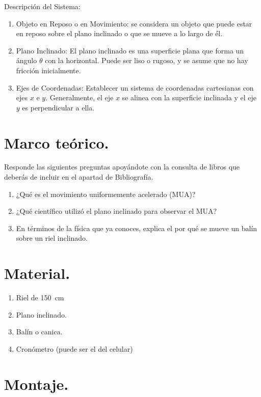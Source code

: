 \documentclass[14pt]{extarticle}
\begin{document}
Descripción del Sistema:

\begin{enumerate}
\item Objeto en Reposo o en Movimiento: se considera un objeto que puede estar en reposo sobre el plano inclinado o que se mueve a lo largo de él.
\item Plano Inclinado: El plano inclinado es una superficie plana que forma un ángulo $\theta$ con la horizontal. Puede ser liso o rugoso, y se asume que no hay fricción inicialmente.
\item Ejes de Coordenadas: Establecer un sistema de coordenadas cartesianas con ejes $x$ e $y$. Generalmente, el eje $x$ se alinea con la superficie inclinada y el eje $y$ es perpendicular a ella.
\end{enumerate}

\section{Marco teórico.}

Responde las siguientes preguntas apoyándote con la consulta de libros que deberás de incluir en el apartad de Bibliografía.

\begin{enumerate}
\item ¿Qué es el movimiento uniformemente acelerado (MUA)?
\item ¿Qué científico utilizó el plano inclinado para observar el MUA?
\item En términos de la física que ya conoces, explica el por qué se mueve un balín sobre un riel inclinado.
\end{enumerate}

\section{Material.}

\begin{enumerate}
\item Riel de \SI{150}{\centi\meter}
\item Plano inclinado.
\item Balín o canica.
\item Cronómetro (puede ser el del celular)
\end{enumerate}

\section{Montaje.}
\end{document}
